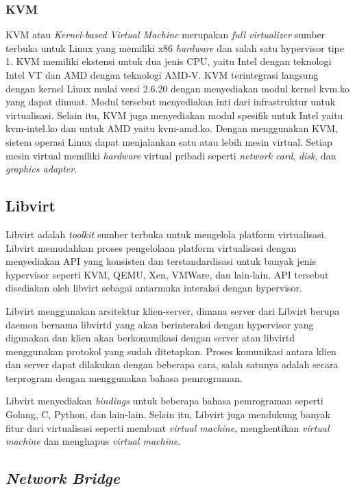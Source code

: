 \subsubsection{KVM}
\label{sec:kvm}

KVM atau \emph{Kernel-based Virtual Machine} \parencite{kvm-website} merupakan \emph{full virtualizer} sumber terbuka
untuk Linux yang memiliki x86 \emph{hardware} dan salah satu hypervisor tipe 1. KVM memiliki ekstensi untuk dua jenis
CPU, yaitu Intel dengan teknologi Intel VT dan AMD dengan teknologi AMD-V. KVM terintegrasi
langsung dengan kernel Linux mulai versi 2.6.20 dengan menyediakan modul kernel kvm.ko yang dapat dimuat.
Modul tersebut menyediakan inti dari infrastruktur untuk virtualisasi. Selain itu, KVM
juga menyediakan modul spesifik untuk Intel yaitu kvm-intel.ko dan untuk AMD yaitu
kvm-amd.ko. Dengan menggunakan KVM, sistem operasi Linux dapat menjalankan satu atau lebih
mesin virtual. Setiap mesin virtual memiliki \emph{hardware} virtual pribadi seperti
\emph{network card}, \emph{disk}, dan \emph{graphics adapter}.

\subsection{Libvirt}
\label{sec:libvirt}

Libvirt adalah \emph{toolkit} sumber terbuka untuk mengelola platform virtualisasi.
Libvirt memudahkan proses pengelolaan platform virtualisasi dengan menyediakan API yang konsisten
dan terstandardisasi untuk banyak jenis hypervisor seperti KVM, QEMU, Xen, VMWare,
dan lain-lain. API tersebut disediakan oleh libvirt sebagai antarmuka interaksi dengan hypervisor.

Libvirt menggunakan arsitektur klien-server, dimana server dari Libvirt berupa daemon
bernama libvirtd yang akan berinteraksi dengan hypervisor yang digunakan dan klien akan
berkomunikasi dengan server atau libvirtd menggunakan protokol yang sudah ditetapkan.
Proses komunikasi antara klien dan server dapat dilakukan dengan beberapa cara, salah
satunya adalah secara terprogram dengan menggunakan bahasa pemrograman.

Libvirt menyediakan \emph{bindings} untuk beberapa bahasa pemrograman seperti Golang, C, Python, dan
lain-lain. Selain itu, Libvirt juga mendukung banyak fitur dari virtualisasi seperti
membuat \emph{virtual machine}, menghentikan \emph{virtual machine} dan menghapus \emph{virtual machine}.

\subsection{\emph{Network Bridge}}
\label{sec:network-bridge}

